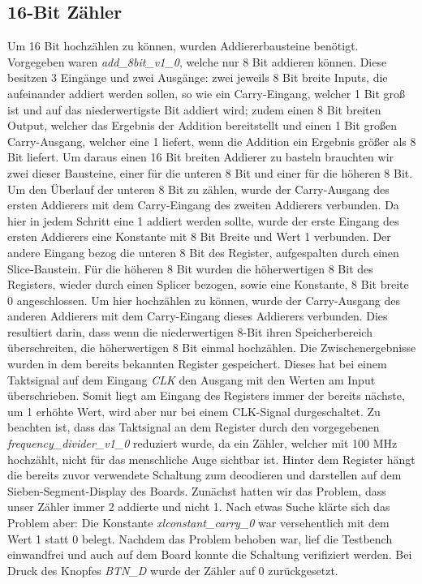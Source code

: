 \documentclass[11pt, a4paper]{article}
\begin{document}
\subsection*{16-Bit Zähler}
Um 16 Bit hochzählen zu können, wurden Addiererbausteine benötigt.
Vorgegeben waren \textit{add\_8bit\_v1\_0}, welche nur 8 Bit addieren können. 
Diese besitzen 3 Eingänge und zwei Ausgänge: zwei jeweils 8 Bit breite Inputs, die aufeinander addiert werden sollen, so wie ein Carry-Eingang, welcher 1 Bit groß ist und auf das niederwertigste Bit addiert wird; zudem einen 8 Bit breiten Output, welcher das Ergebnis der Addition bereitstellt und einen 1 Bit großen Carry-Ausgang, welcher eine 1 liefert, wenn die Addition ein Ergebnis größer als 8 Bit liefert.
\newline
Um daraus einen 16 Bit breiten Addierer zu basteln brauchten wir zwei dieser Bausteine, einer für die unteren 8 Bit und einer für die höheren 8 Bit.
Um den Überlauf der unteren 8 Bit zu zählen, wurde der Carry-Ausgang des ersten Addierers mit dem Carry-Eingang des zweiten Addierers verbunden.
Da hier in jedem Schritt eine 1 addiert werden sollte, wurde der erste Eingang des ersten Addierers eine Konstante mit 8 Bit Breite und Wert 1 verbunden.
Der andere Eingang bezog die unteren 8 Bit des Register, aufgespalten durch einen Slice-Baustein.
\newline
Für die höheren 8 Bit wurden die höherwertigen 8 Bit des Registers, wieder durch einen Splicer bezogen, sowie eine Konstante, 8 Bit breite 0 angeschlossen.
Um hier hochzählen zu können, wurde der Carry-Ausgang des anderen Addierers mit dem Carry-Eingang dieses Addierers verbunden.
Dies resultiert darin, dass wenn die niederwertigen 8-Bit ihren Speicherbereich überschreiten, die höherwertigen 8 Bit einmal hochzählen.
\newline
Die Zwischenergebnisse wurden in dem bereits bekannten Register gespeichert. Dieses hat bei einem Taktsignal auf dem Eingang \textit{CLK} den Ausgang mit den Werten am Input überschrieben. Somit liegt am Eingang des Registers immer der bereits nächste, um 1 erhöhte Wert, wird aber nur bei einem CLK-Signal durgeschaltet.
Zu beachten ist, dass das Taktsignal an dem Register durch den vorgegebenen \textit{frequency\_divider\_v1\_0} reduziert wurde, da ein Zähler, welcher mit 100 MHz hochzählt, nicht für das menschliche Auge sichtbar ist.
\newline
Hinter dem Register hängt die bereits zuvor verwendete Schaltung zum decodieren und darstellen auf dem Sieben-Segment-Display des Boards.
\newline
Zunächst hatten wir das Problem, dass unser Zähler immer 2 addierte und nicht 1. Nach etwas Suche klärte sich das Problem aber: Die Konstante \textit{xlconstant\_carry\_0} war versehentlich mit dem Wert 1 statt 0 belegt.
Nachdem das Problem behoben war, lief die Testbench einwandfrei und auch auf dem Board konnte die Schaltung verifiziert werden. Bei Druck des Knopfes \textit{BTN\_D} wurde der Zähler auf 0 zurückgesetzt.
\end{document}
